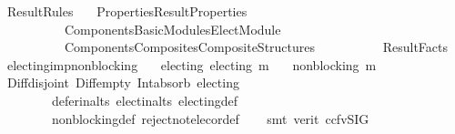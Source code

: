 %
\begin{isabellebody}%
%
%
\isadelimtheory
%
\endisadelimtheory
%
\isatagtheory
{}\isamarkupfalse%
\ Result{\isacharunderscore}{\kern0pt}Rules\isanewline
\ \ \ {\isachardoublequoteopen}{\isachardot}{\kern0pt}{\isachardot}{\kern0pt}{\isacharslash}{\kern0pt}Properties{\isacharslash}{\kern0pt}Result{\isacharunderscore}{\kern0pt}Properties{\isachardoublequoteclose}\isanewline
\ \ \ \ \ \ \ \ \ \ {\isachardoublequoteopen}{\isachardot}{\kern0pt}{\isachardot}{\kern0pt}{\isacharslash}{\kern0pt}Components{\isacharslash}{\kern0pt}Basic{\isacharunderscore}{\kern0pt}Modules{\isacharslash}{\kern0pt}Elect{\isacharunderscore}{\kern0pt}Module{\isachardoublequoteclose}\isanewline
\ \ \ \ \ \ \ \ \ \ {\isachardoublequoteopen}{\isachardot}{\kern0pt}{\isachardot}{\kern0pt}{\isacharslash}{\kern0pt}Components{\isacharslash}{\kern0pt}Composites{\isacharslash}{\kern0pt}Composite{\isacharunderscore}{\kern0pt}Structures{\isachardoublequoteclose}\isanewline
\ \ \ \ \ \ \ \ \ \ Result{\isacharunderscore}{\kern0pt}Facts\isanewline
\isanewline
{}%
\endisatagtheory
{\isafoldtheory}%
%
\isadelimtheory
\isanewline
%
\endisadelimtheory
\isanewline
{}\isamarkupfalse%
\ electing{\isacharunderscore}{\kern0pt}imp{\isacharunderscore}{\kern0pt}non{\isacharunderscore}{\kern0pt}blocking{\isacharcolon}{\kern0pt}\isanewline
\ \ \ electing{\isacharcolon}{\kern0pt}\ {\isachardoublequoteopen}electing\ m{\isachardoublequoteclose}\isanewline
\ \ \ {\isachardoublequoteopen}non{\isacharunderscore}{\kern0pt}blocking\ m{\isachardoublequoteclose}\isanewline
%
\isadelimproof
\ \ %
\endisadelimproof
%
\isatagproof
{}\isamarkupfalse%
\ Diff{\isacharunderscore}{\kern0pt}disjoint\ Diff{\isacharunderscore}{\kern0pt}empty\ Int{\isacharunderscore}{\kern0pt}absorb{}\ electing\isanewline
\ \ \ \ \ \ \ \ defer{\isacharunderscore}{\kern0pt}in{\isacharunderscore}{\kern0pt}alts\ elect{\isacharunderscore}{\kern0pt}in{\isacharunderscore}{\kern0pt}alts\ electing{\isacharunderscore}{\kern0pt}def\isanewline
\ \ \ \ \ \ \ \ non{\isacharunderscore}{\kern0pt}blocking{\isacharunderscore}{\kern0pt}def\ reject{\isacharunderscore}{\kern0pt}not{\isacharunderscore}{\kern0pt}elec{\isacharunderscore}{\kern0pt}or{\isacharunderscore}{\kern0pt}def\isanewline
\ \ \isamarkupfalse%
\ {\isacharparenleft}{\kern0pt}smt\ {\isacharparenleft}{\kern0pt}verit{\isacharcomma}{\kern0pt}\ ccfv{\isacharunderscore}{\kern0pt}SIG{\isacharparenright}{\kern0pt}{\isacharparenright}{\kern0pt}%

\end{isabellebody}
